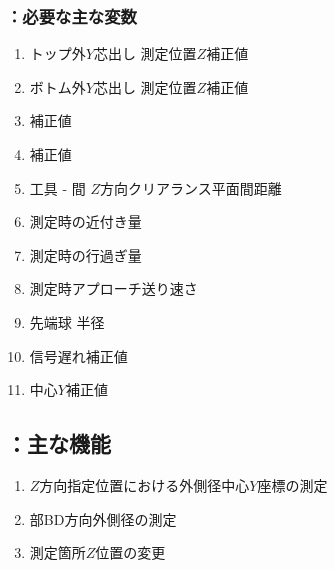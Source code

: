 \subsubsection{\MYOThickness：必要な主な変数}
\begin{enumerate}[label*=\sarrow]
\item トップ外$Y$芯出し 測定位置$Z$補正値
\item ボトム外$Y$芯出し 測定位置$Z$補正値
\item \KeywayPos 補正値
\item \KeywayWidth 補正値
\item 工具 - \EndFace 間 $Z$方向クリアランス平面間距離
\item \TouchSensorProbe 測定時の近付き量
\item \TouchSensorProbe 測定時の行過ぎ量
\item \TouchSensorProbe 測定時アプローチ送り速さ
\item \TouchSensorProbe 先端球 半径
\item \TouchSensorProbe 信号遅れ補正値
\item \TouchSensorProbe 中心$Y$補正値
\end{enumerate}


\clearpage
\subsection{\MYOThickness：主な機能}
\begin{enumerate}[label*=\sarrow]
\item $Z$方向指定位置における外側径中心$Y$座標の測定
\item \EndFace 部BD方向外側径の測定
\item 測定箇所$Z$位置の変更
\end{enumerate}



